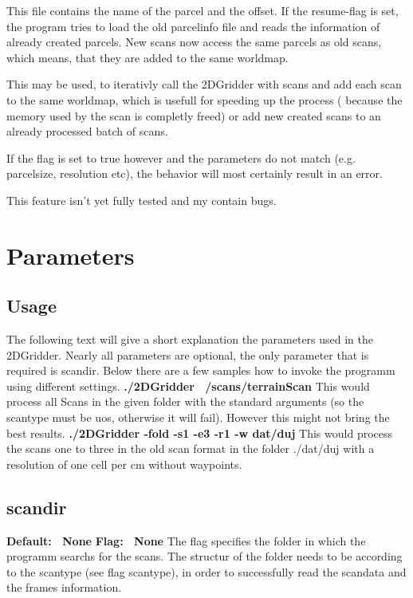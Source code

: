 \documentclass{article}
\begin{document}
This file contains the name of the parcel and the offset. If the resume-flag
is set, the program tries to load the old parcelinfo file and reads the
information of already created parcels. New scans now access the same parcels
as old scans, which means, that they are added to the same worldmap.

This may be used, to iterativly call the 2DGridder with scans and add each
scan to the same worldmap, which is usefull for speeding up the process
( because the memory used by the scan is completly freed) or add new created
scans to an already processed batch of scans.

If the flag is set to true however and the parameters do not match (e.g.
parcelsize, resolution etc), the behavior will most certainly result in
an error.


This feature isn't yet fully tested and my contain bugs.


\section{Parameters}

\subsection{Usage}
The following text will give a short explanation the parameters used in the
2DGridder. Nearly all parameters are optional, the only parameter that is
required is scandir. \newline
Below there are a few samples how to invoke the programm using different
settings.
\newline
{\bf ./2DGridder ~/scans/terrainScan} \newline
This would process all Scans in the given folder with the standard arguments 
(so the scantype must be uos, otherwise it will fail). However this might not 
bring the best results.
\newline
\newline
{\bf ./2DGridder -fold -s1 -e3 -r1 -w dat/duj} \newline
This would process the scans one to three in the old scan format in the folder
./dat/duj with a resolution of one cell per cm without waypoints.

\subsection{scandir}
{\bf Default: \ None} \newline
{\bf Flag: \ None} \newline
The flag specifies the folder in which the programm searchs for the scans. The
structur of the folder needs to be according to the scantype (see flag
scantype), in order to successfully read the scandata and the frames
information.
\end{document}
